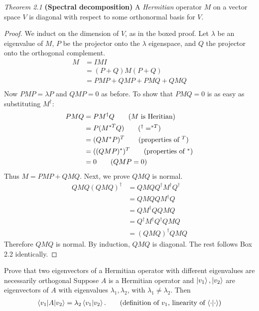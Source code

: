 \noindent\textit{Theorem 2.1} \textbf{(Spectral decomposition)} A \textit{Hermitian} operator $M$ on a vector space $V$ is diagonal with respect to some orthonormal basis for $V$. 
\begin{proof} We induct on the dimension of $V$, as in the boxed proof.  Let $\lambda$ be an eigenvalue of $M$, $P$ be the projector onto the $\lambda$ eigenspace, and $Q$ the projector onto the orthogonal complement.
\begin{align*}
	M &= IMI \tag{trivial}\\
		&= (P+Q) M (P+Q)\tag{definition of $Q$}\\
		&= PMP + QMP + PMQ + QMQ\tag{expand}\\
\end{align*}
Now $PMP = \lambda P$ and $QMP = 0$ as before. To show that $PMQ = 0$ is as easy as substituting $M^\dagger$: 
\begin{align*}
PMQ &= PM^\dagger Q \tag{$M$ is Heritian}\\
&= P(M^{*T}Q) \tag{$^{\dagger}=^{*T}$}\\
&=(QM^*P)^{T} \tag{properties of $^T$}\\
&=((QMP)^*)^T \tag{properties of $^*$}\\
&= 0 \tag{$QMP = 0$}
\end{align*}
Thus $M = PMP + QMQ$.
Next, we prove $QMQ$ is normal.
\begin{align*}
	QMQ (QMQ)^\dagger &= QMQ Q^\dagger M^\dagger Q^\dagger \tag{properties of $^\dagger$, and symmetry}\\
		&= QMQQM^\dagger Q \tag{projectors are Hermitian} \\
		&= QM^\dagger Q QMQ \tag{$M = M^\dagger$}\\
		&=Q^\dagger M^\dagger Q^\dagger QMQ \tag{projectors are Hermitian} \\
		&= (QMQ)^\dagger QMQ  \tag{properties of $^\dagger$, and symmetry}
\end{align*}
Therefore $QMQ$ is normal.
By induction, $QMQ$ is diagonal.  The rest follows Box 2.2 identically.
\end{proof}

 Prove that two eigenvectors of a Hermitian operator with different eigenvalues are necessarily orthogonal
\Soln
Suppose $A$ is a Hermitian operator and $\ket{v_1}, \ket{v_2}$ are eigenvectors of $A$ with eigenvalues $\lambda_1, \lambda_2$, with $\lambda_1\neq\lambda_2$.
Then
\begin{align*}
	\braket{v_1 | A | v_2} = \lambda_2 \braket{v_1 | v_2}. \tag{definition of $v_1$, linearity of $\braket{\cdot |\cdot}$}
\end{align*}

